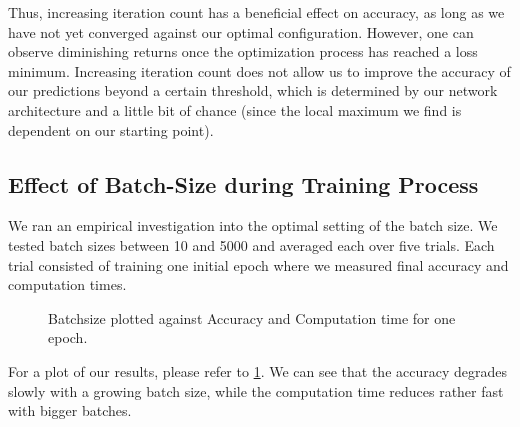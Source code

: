 \documentclass{article}
\begin{document}
Thus, increasing iteration count has a beneficial effect on accuracy, as long as we have not yet converged against our optimal configuration. However, one can observe diminishing returns once the optimization process has reached a loss minimum. Increasing iteration count does not allow us to improve the accuracy of our predictions beyond a certain threshold, which is determined by our network architecture and a little bit of chance (since the local maximum we find is dependent on our starting point).

\subsection{Effect of Batch-Size during Training Process}
We ran an empirical investigation into the optimal setting of the batch size. We tested batch sizes between 10 and 5000 and averaged each over five trials. Each trial consisted of training one initial epoch where we measured final accuracy and computation times.

\begin{figure}[h]
\centering
{}
\caption{Batchsize plotted against Accuracy and Computation time for one epoch.}\label{batchsizes}
\end{figure}

For a plot of our results, please refer to \ref{batchsizes}.
We can see that the accuracy degrades slowly with a growing batch size, while the computation time reduces rather fast with bigger batches.
\end{document}
